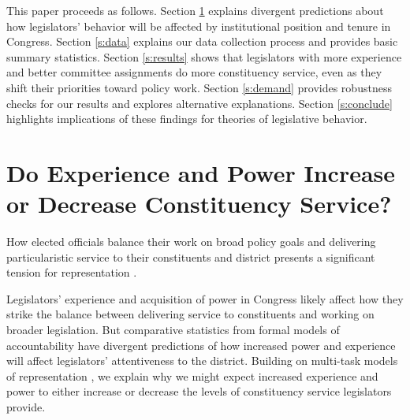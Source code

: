 \documentclass[12pt]{article}
\begin{document}
This paper proceeds as follows. Section \ref{s:theory} explains divergent predictions about how legislators' behavior will be affected by institutional position and tenure in Congress. Section \ref{s:data} explains our data collection process and provides basic summary statistics. Section \ref{s:results} shows that legislators with more experience and better committee assignments do more constituency service, even as they shift their priorities toward policy work. Section \ref{s:demand} provides robustness checks for our results and explores alternative explanations. Section \ref{s:conclude} highlights implications of these findings for theories of legislative behavior.

\section{Do Experience and Power Increase or Decrease Constituency Service?} \label{s:theory}

How elected officials balance their work on broad policy goals and delivering particularistic service to their constituents and district presents a significant tension for representation \citep{AshworthBuenodeMesquita2006}.

Legislators' experience and acquisition of power in Congress likely affect how they strike the balance between delivering service to constituents and working on broader legislation. But comparative statistics from formal models of accountability have divergent predictions of how increased power and experience will affect legislators' attentiveness to the district. Building on multi-task models of representation \citep{AshworthBuenodeMesquita2006, gordon2009advantages}, we explain why we might expect increased experience and power to either increase or decrease the levels of constituency service legislators provide.


\end{document}
